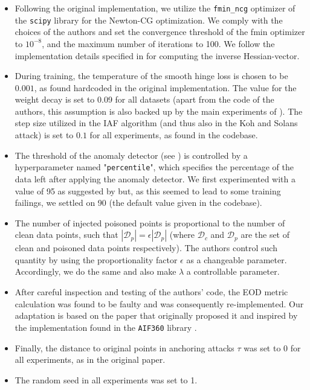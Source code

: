 \begin{itemize}
    \item Following the original implementation, we utilize the \texttt{fmin\_ncg} optimizer of the \texttt{scipy} library \citep{scipy} for the Newton-CG optimization. We comply with the choices of the authors and set the convergence threshold of the fmin optimizer to $10^{-8}$, and the maximum number of iterations to 100. We follow the implementation details specified in \cite{koh2018} for computing the inverse Hessian-vector.
    
    \item During training, the temperature of the smooth hinge loss is chosen to be $0.001$, as found hardcoded in the original implementation. The value for the weight decay is set to 0.09 for all datasets (apart from the code of the authors, this assumption is also backed up by the main experiments of ). The step size utilized in the IAF algorithm (and thus also in the Koh and Solans attack) is set to $0.1$ for all experiments, as found in the codebase.
    
    \item The threshold of the anomaly detector (see \cite{koh2018}) is controlled by a hyperparameter named "\texttt{percentile}", which specifies the percentage of the data left after applying the anomaly detector. We first experimented with a value of 95 as suggested by  but, as this seemed to lead to some training failings, we settled on 90 (the default value given in the codebase).
    
    \item The number of injected poisoned points is proportional to the number of clean data points, such that $|\mathcal{D}_p| = \epsilon|\mathcal{D}_p|$ (where $\mathcal{D}_c$ and $\mathcal{D}_p$ are the set of clean and poisoned data points respectively). The authors control such quantity by using the proportionality factor $\epsilon$ as a changeable parameter. Accordingly, we do the same and also make $\lambda$ a controllable parameter.
    
    \item After careful inspection and testing of the authors' code, the EOD metric calculation was found to be faulty and was consequently re-implemented. Our adaptation is based on the paper that originally proposed it \cite{EOD-measure} and inspired by the implementation found in the \texttt{AIF360} library \citep{aif360}.
    
    \item Finally, the distance to original points in anchoring attacks $\tau$ was set to 0 for all experiments, as in the original paper. 
    
    \item The random seed in all experiments was set to 1.
    
\end{itemize}

